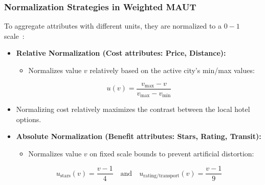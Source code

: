 \begin{frame}
    \frametitle{Normalization Strategies in Weighted MAUT}
    To aggregate attributes with different units, they are normalized to a $0-1$ scale~\cite{keeney1993decisions}:
    \begin{itemize}
        \item \textbf{Relative Normalization (Cost attributes: Price, Distance):}
            \begin{itemize}
                \item Normalizes value $v$ relatively based on the active city's min/max values:
            \end{itemize}
            \begin{equation*}
              u(v) = \frac{v_{\max} - v}{v_{\max} - v_{\min}}
            \end{equation*}
            \item Normalizing cost relatively maximizes the contrast between the local hotel options.
        \item \textbf{Absolute Normalization (Benefit attributes: Stars, Rating, Transit):}
            \begin{itemize}
                \item Normalizes value $v$ on fixed scale bounds to prevent artificial distortion:
            \end{itemize}
            \begin{equation*}
              u_{\text{stars}}(v) = \frac{v - 1}{4} \quad \text{and} \quad u_{\text{rating/transport}}(v) = \frac{v - 1}{9}
            \end{equation*}
    \end{itemize}
\end{frame}

